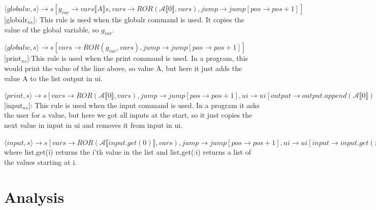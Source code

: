\documentclass{article}
\begin{document}
\begin{itemize}
$\langle globalw,s \rangle \rightarrow s[g_{var} \rightarrow vars \llbracket A\rrbracket s, vars \rightarrow ROR(\mathscr{A}\llbracket 0\rrbracket, vars),jump \rightarrow jump[pos \rightarrow pos+1]]$\\

{[globalr$_{ns}$]}: This rule is used when the globalr command is used. It copies the value of the global variable, so $g_{var}$.

$\langle globalw,s \rangle \rightarrow s[vars \rightarrow ROR(g_{var}, vars), jump \rightarrow jump[pos \rightarrow pos+1]]$\\

{[print$_{ns}$]}:This rule is used when the print command is used. In a program, this would print the value of the line above, so value A, but here it just adds the value A to the list output in ui.

$\langle print,s \rangle \rightarrow s[vars \rightarrow ROR(\mathscr{A}\llbracket 0\rrbracket, vars),jump \rightarrow jump[pos \rightarrow pos+1], ui\rightarrow ui[output \rightarrow output.append(\mathscr{A}\llbracket 0\rrbracket)]]$\\

{[input$_{ns}$]}: This rule is used when the input command is used. In a program it asks the user for a value, but here we got all inputs at the start, so it just copies the next value in input in ui and removes it from input in ui.

$\langle input,s \rangle \rightarrow s[vars \rightarrow ROR(\mathscr{A}\llbracket input.get(0)\rrbracket, vars),jump \rightarrow jump[pos \rightarrow pos+1], ui\rightarrow ui[input \rightarrow input.get(:1)]]$\\

where list.get(i) returns the i'th value in the list and list.get(:i) returns a list of the values starting at i.

\end{itemize}



\section{Analysis}
\end{document}
